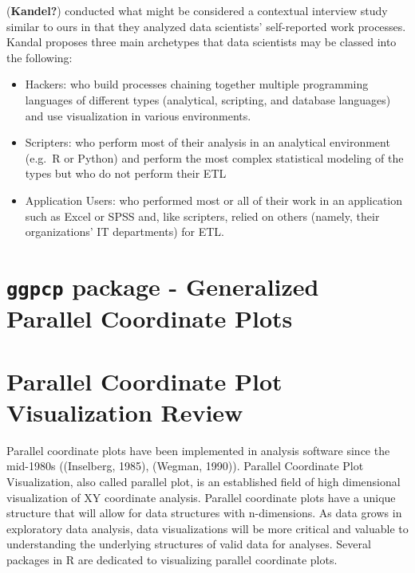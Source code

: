 \documentclass[print]{nuthesis}
\providecommand{\tightlist}{%
  \setlength{\itemsep}{0pt}\setlength{\parskip}{0pt}}
\begin{document}
(\textbf{Kandel?}) conducted what might be considered a contextual interview study similar to ours in that they analyzed data scientists' self-reported work processes. Kandal proposes three main archetypes that data scientists may be classed into the following:

\begin{itemize}
\tightlist
\item
  Hackers: who build processes chaining together multiple programming languages of different types (analytical, scripting, and database languages) and use visualization in various environments.
\item
  Scripters: who perform most of their analysis in an analytical environment (e.g.~R or Python) and perform the most complex statistical modeling of the types but who do not perform their ETL
\item
  Application Users: who performed most or all of their work in an application such as Excel or SPSS and, like scripters, relied on others (namely, their organizations' IT departments) for ETL.
\end{itemize}

\hypertarget{ggpcp-package---generalized-parallel-coordinate-plots}{%
\section{\texorpdfstring{\texttt{ggpcp} package - Generalized Parallel Coordinate Plots}{ggpcp package - Generalized Parallel Coordinate Plots}}\label{ggpcp-package---generalized-parallel-coordinate-plots}}

\hypertarget{parallel-coordinate-plot-visualization-review}{%
\section{Parallel Coordinate Plot Visualization Review}\label{parallel-coordinate-plot-visualization-review}}

Parallel coordinate plots have been implemented in analysis software since the mid-1980s ((Inselberg, 1985), (Wegman, 1990)). Parallel Coordinate Plot Visualization, also called parallel plot, is an established field of high dimensional visualization of XY coordinate analysis. Parallel coordinate plots have a unique structure that will allow for data structures with n-dimensions. As data grows in exploratory data analysis, data visualizations will be more critical and valuable to understanding the underlying structures of valid data for analyses. Several packages in R are dedicated to visualizing parallel coordinate plots.
\end{document}
